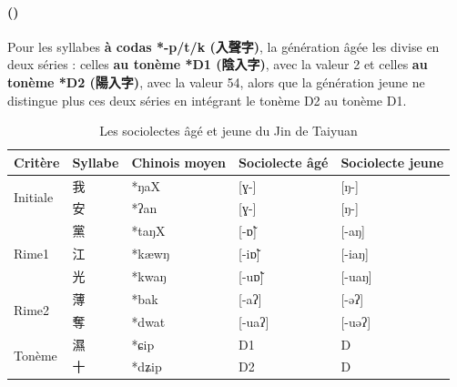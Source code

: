 \documentclass{scrbook}
\newcounter{c}[subsubsection]
\newcommand{\stpc}[1]{\stepcounter{#1}}
\newcommand{\diflaoxin}{sociolectes âgé et jeune\xspace}
\newcommand{\iso}{syllabes isolées\xspace}
\newcommand{\termyyx}[1]{\textbf{#1}}
\begin{document}
\begin{sloppypar}
%
%
%
%
%
%
%
%

\stpc{c}\paragraph{()}
Pour les syllabes \termyyx{à codas *-p/t/k (入聲字)}, la génération âgée les divise en deux séries : celles \termyyx{au tonème *D1 (陰入字)}, avec la valeur 2 et celles \termyyx{au tonème *D2 (陽入字)}, avec la valeur 54, alors que la génération jeune ne distingue plus ces deux séries en intégrant le tonème D2 au tonème D1.

\begin{table}[htbp]
  \centering
    \begin{tabular}{lllll}
    \toprule
    Critère & Syllabe & Chinois moyen  & Sociolecte âgé & Sociolecte jeune \\
    \midrule
    \multirow{2}[2]{*}{Initiale} & 我     & *ŋaX  & [ɣ-]  & [ŋ-] \\
          & 安     & *ʔan  & [ɣ-]  & [ŋ-] \\
    \midrule
    \multirow{3}[2]{*}{Rime1} & 黨     & *taŋX & [-ɒ̃] & [-aŋ] \\
          & 江     & *kæwŋ & [-iɒ̃] & [-iaŋ] \\
          & 光     & *kwaŋ & [-uɒ̃] & [-uaŋ] \\
    \midrule
    \multirow{2}[2]{*}{Rime2} & 薄     & *bak  & [-aʔ] & [-əʔ] \\
          & 奪     & *dwat & [-uaʔ] & [-uəʔ] \\
    \midrule
    \multirow{2}[2]{*}{Tonème} & 濕     & *ɕip  & D1     & D \\
          & 十     & *dʑip & D2    & D \\
    \bottomrule
    \end{tabular}%
  \caption{Les \diflaoxin du Jin de Taiyuan}
  \label{tab:Taiyuan2}%
\end{table}%



\end{sloppypar}
\end{document}

